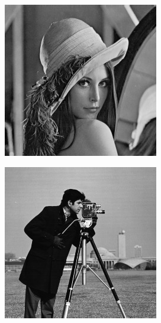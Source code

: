 \begin{figure}[H]
\begin{subfigure}[b]{0.15\textwidth}
                    \caption{}
                    \label{fig:waterloo-slop}
                \end{subfigure}
                \hfill
                \begin{subfigure}[b]{0.15\textwidth}
                    \centering
                    \includegraphics[width=\textwidth]{images/lena1.jpg}
                    \caption{}
                    \label{fig:waterloo-lena1}
                \end{subfigure}
                \hfill
                \begin{subfigure}[b]{0.15\textwidth}
                    \centering
                    \includegraphics[width=\textwidth]{images/camera.jpg}

\end{subfigure}
\end{figure}
